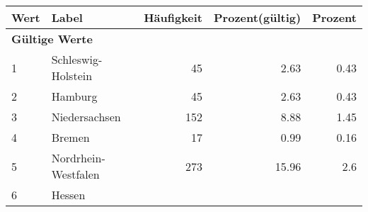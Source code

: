      \begin{longtable}{lXrrr}
     \toprule
     \textbf{Wert} & \textbf{Label} & \textbf{Häufigkeit} & \textbf{Prozent(gültig)} & \textbf{Prozent} \\
     \endhead
     \midrule
     \multicolumn{5}{l}{\textbf{Gültige Werte}}\\

     1 &
     \multicolumn{1}{X}{ Schleswig-Holstein   } &


       \num{45} &
       \num[round-mode=places,round-precision=2]{2,63} &
         \num[round-mode=places,round-precision=2]{0,43} \\

     2 &
     \multicolumn{1}{X}{ Hamburg   } &


       \num{45} &
       \num[round-mode=places,round-precision=2]{2,63} &
         \num[round-mode=places,round-precision=2]{0,43} \\

     3 &
     \multicolumn{1}{X}{ Niedersachsen   } &


       \num{152} &
       \num[round-mode=places,round-precision=2]{8,88} &
         \num[round-mode=places,round-precision=2]{1,45} \\

     4 &
     \multicolumn{1}{X}{ Bremen   } &


       \num{17} &
       \num[round-mode=places,round-precision=2]{0,99} &
         \num[round-mode=places,round-precision=2]{0,16} \\

     5 &
     \multicolumn{1}{X}{ Nordrhein-Westfalen   } &


       \num{273} &
       \num[round-mode=places,round-precision=2]{15,96} &
         \num[round-mode=places,round-precision=2]{2,6} \\

     6 &
     \multicolumn{1}{X}{ Hessen   } &



\end{longtable}
